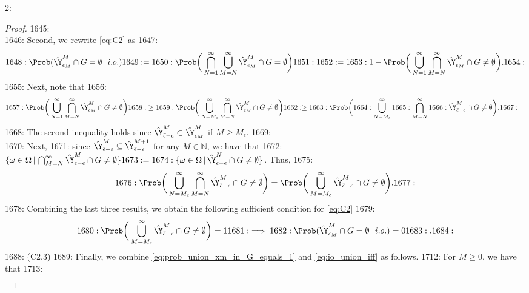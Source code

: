 2: \documentclass[12pt]{l4dc2022} %
\begin{document}
\begin{proof}
1645: \\
1646: Second, we rewrite \eqref{eq:C2} as
1647: \begin{align}
1648: \Prob(\hat\Y^M_{\epsilon_M}\cap G = \emptyset \ \ i.o.)
1649: =
1650: \Prob\bigg(\bigcap_{N=1}^\infty\bigcup_{M=N}^\infty \hat\Y^M_{\epsilon_M}\cap G = \emptyset\bigg)
1651: \nonumber
1652: =
1653: 1 - \Prob\bigg(\bigcup_{N=1}^\infty\bigcap_{M=N}^\infty \hat\Y^M_{\epsilon_M}\cap G \neq \emptyset\bigg).
1654: \end{align}
1655: Next, note that 
1656: \begin{align*}
1657: \Prob\bigg(\bigcup_{N=1}^\infty\bigcap_{M=N}^\infty \hat\Y^M_{\epsilon_M}\cap G \neq \emptyset\bigg)
1658: &\geq 
1659: \Prob\bigg(\bigcup_{N=M_\epsilon}^\infty\bigcap_{M=N}^\infty \hat\Y^M_{\epsilon_M}\cap G\neq \emptyset\bigg)
1662: \geq 
1663: \Prob\bigg(
1664: \bigcup_{N=M_\epsilon}^\infty
1665: \bigcap_{M=N}^\infty
1666: \hat\Y^M_{\bar{\epsilon}-\epsilon}\cap G \neq \emptyset\bigg).
1667: \end{align*}
1668: The second inequality holds since $\hat\Y^M_{\bar{\epsilon}-\epsilon}\subset \hat\Y^M_{\epsilon_M}$ if $M\geq M_\epsilon$. %
1669: \\
1670: Next, 
1671: since $\hat\Y^M_{\bar{\epsilon}-\epsilon}\subseteq\hat\Y^{M+1}_{\bar{\epsilon}-\epsilon}$ for any $M\in\mathbb{N}$, we have that 
1672: $\{\omega\in\Omega\, |\, \bigcap_{M=N}^\infty \hat\Y^M_{\bar{\epsilon}-\epsilon}\cap G \neq \emptyset\}
1673: =
1674: \{\omega\in\Omega \, |\, \hat\Y^N_{\bar{\epsilon}-\epsilon}\cap G \neq \emptyset\}$. Thus, 
1675: \begin{equation}\nonumber
1676: \Prob\bigg(\bigcup_{N=M_{\epsilon}}^\infty\bigcap_{M=N}^\infty \hat\Y^M_{\bar{\epsilon}-\epsilon}\cap G \neq \emptyset\bigg)=\Prob\bigg(\bigcup_{M=M_\epsilon}^\infty\hat\Y^M_{\bar{\epsilon}-\epsilon}\cap G \neq \emptyset\bigg).
1677: \end{equation}
1678: Combining the last three results, we obtain the following sufficient condition for \eqref{eq:C2}
1679: \begin{equation}\label{eq:io_union_iff}
1680: \Prob\bigg(\bigcup_{M=M_\epsilon}^\infty\hat\Y^M_{\bar{\epsilon}-\epsilon}\cap G \neq \emptyset\bigg) = 1
1681: 	\implies
1682: 	\Prob(\hat\Y^M_{\epsilon_M}\cap G = \emptyset \ \ i.o.) = 0 
1683: .
1684: \end{equation}
1688: (C2.3) 
1689: Finally, we combine \eqref{eq:prob_union_xm_in_G_equals_1} and \eqref{eq:io_union_iff} as follows. 
1712: For $M\geq 0$, we have that
1713: \begin{align*}

\end{align*}
\end{proof}
\end{document}
